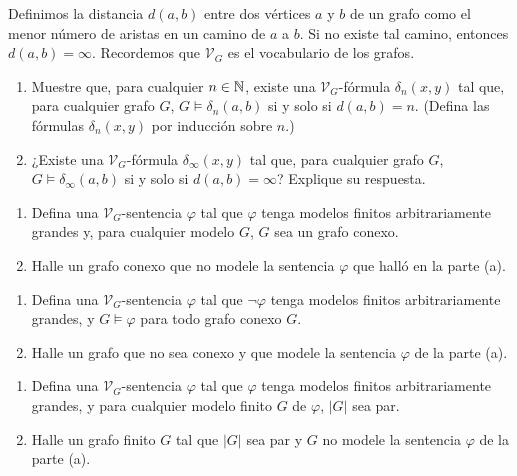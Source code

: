 \message{ !name(main.tex)}\documentclass[12pt,a4paper]{book}
\newcommand{\VV}{\mathcal{V}}
\begin{document}
    \begin{ejercicio}
        Definimos la distancia $d(a,b)$ entre dos vértices $a$ y $b$ de un grafo como el menor número de aristas en un
        camino de $a$ a $b$. Si no existe tal camino, entonces $d(a,b)=\infty$. Recordemos que $\VV_{G}$ es el vocabulario
        de los grafos.
        \begin{enumerate}[label=(\alph*)]
            \item Muestre que, para cualquier $n\in\mathbb{N}$, existe una $\VV_{G}$-fórmula $\delta_{n}(x,y)$ tal que, para
            cualquier grafo $G$, $G\models\delta_{n}(a,b)$ si y solo si $d(a,b)=n$. (Defina las fórmulas $\delta_{n}(x,y)$
            por inducción sobre $n$.)
            \item ¿Existe una $\VV_{G}$-fórmula $\delta_{\infty}(x,y)$ tal que, para cualquier grafo $G$,
            $G\models\delta_{\infty}(a,b)$ si y solo si $d(a,b)=\infty$? Explique su respuesta.
        \end{enumerate}
    \end{ejercicio}

    \begin{ejercicio}
        \begin{enumerate}[label=(\alph*)]
            \item Defina una $\VV_{G}$-sentencia $\varphi$ tal que $\varphi$ tenga modelos finitos arbitrariamente grandes
            y, para cualquier modelo $G$, $G$ sea un grafo conexo.
            \item Halle un grafo conexo que no modele la sentencia $\varphi$ que halló en la parte (a).
        \end{enumerate}
    \end{ejercicio}

    \begin{ejercicio}
        \begin{enumerate}[label=(\alph*)]
            \item Defina una $\VV_{G}$-sentencia $\varphi$ tal que $\neg\varphi$ tenga modelos finitos arbitrariamente
            grandes, y $G\models\varphi$ para todo grafo conexo $G$.
            \item Halle un grafo que no sea conexo y que modele la sentencia $\varphi$ de la parte (a).
        \end{enumerate}
    \end{ejercicio}

    \begin{ejercicio}
        \begin{enumerate}[label=(\alph*)]
            \item Defina una $\VV_{G}$-sentencia $\varphi$ tal que $\varphi$ tenga modelos finitos arbitrariamente
            grandes, y para cualquier modelo finito $G$ de $\varphi$, $|G|$ sea par.
            \item Halle un grafo finito $G$ tal que $|G|$ sea par y $G$ no modele la sentencia $\varphi$ de la parte (a).
        \end{enumerate}
    \end{ejercicio}
\end{document}
